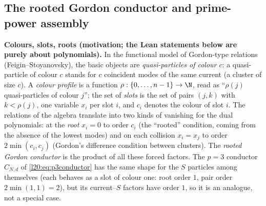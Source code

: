 \subsection{The rooted Gordon conductor and prime-power assembly}

\textbf{Colours, slots, roots (motivation; the Lean statements below are purely about polynomials).} In the functional model of Gordon-type relations (Feigin--Stoyanovsky), the basic objects are
\emph{quasi-particles of colour $c$}: a quasi-particle of colour $c$ stands for $c$ coincident modes of the same current (a cluster of
size $c$). A \emph{colour profile} is a function $\rho:\{0,\dots,n-1\}\to\N$, read as ``$\rho(j)$ quasi-particles of colour $j$''; the
set of \emph{slots} is the set of pairs $(j,k)$ with $k<\rho(j)$, one variable $x_i$ per slot $i$, and $c_i$ denotes the colour of slot $i$.
The relations of the algebra translate into two kinds of vanishing for the dual polynomials: at the \emph{root} $x_i=0$ to order $c_i$
(the ``rooted'' condition, coming from the absence of the lowest modes) and on each collision $x_i=x_j$ to order $2\min(c_i,c_j)$ (Gordon's
difference condition between clusters). The \emph{rooted Gordon conductor} is the product of all these forced factors. The $p=3$ conductor
$C_{N,d}$ of \eqref{l20:eq:p3conductor} has the same shape for the $S$ particles among themselves (each behaves as a slot of colour one:
root order $1$, pair order $2\min(1,1)=2$), but its current--$S$ factors have order $1$, so it is an analogue, not a special case.

